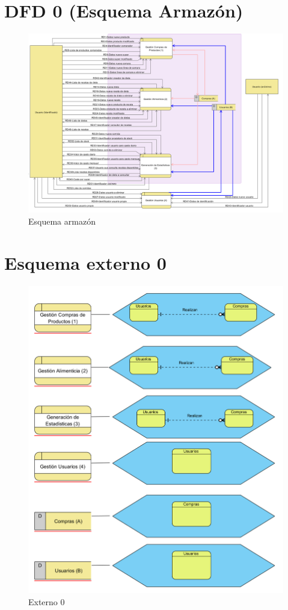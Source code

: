 \documentclass[a4paper,12pt]{report}
\begin{document}
\section{DFD 0 (Esquema Armazón)}
\label{sec-4-1}
\begin{figure}[!htp]
\centering
\includegraphics[width=1\linewidth]{./refinamientos/dfd0.png}
\caption{Esquema armazón}
\label{fig:Esquema armazón}
\medskip
\footnotesize
{}
\end{figure}
\section{Esquema externo 0}
\label{sec-4-2}
\begin{figure}[!htp]
\centering
\includegraphics[width=1\linewidth]{./refinamientos/externo0.png}
\caption{Externo 0}
\label{fig:Externo 0}
\medskip
\footnotesize
{}
\end{figure}
\end{document}
